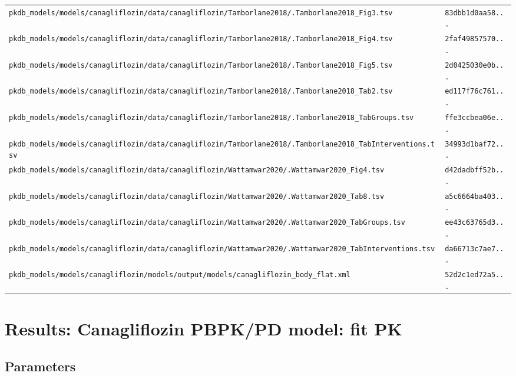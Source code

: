 \documentclass{article}
\begin{document}
\begin{longtable}{ll}
\texttt{pkdb\_models/models/canagliflozin/data/canagliflozin/Tamborlane2018/.Tamborlane2018\_Fig3.tsv} & \texttt{83dbb1d0aa58...} \\
\texttt{pkdb\_models/models/canagliflozin/data/canagliflozin/Tamborlane2018/.Tamborlane2018\_Fig4.tsv} & \texttt{2faf49857570...} \\
\texttt{pkdb\_models/models/canagliflozin/data/canagliflozin/Tamborlane2018/.Tamborlane2018\_Fig5.tsv} & \texttt{2d0425030e0b...} \\
\texttt{pkdb\_models/models/canagliflozin/data/canagliflozin/Tamborlane2018/.Tamborlane2018\_Tab2.tsv} & \texttt{ed117f76c761...} \\
\texttt{pkdb\_models/models/canagliflozin/data/canagliflozin/Tamborlane2018/.Tamborlane2018\_TabGroups.tsv} & \texttt{ffe3ccbea06e...} \\
\texttt{pkdb\_models/models/canagliflozin/data/canagliflozin/Tamborlane2018/.Tamborlane2018\_TabInterventions.tsv} & \texttt{34993d1baf72...} \\
\texttt{pkdb\_models/models/canagliflozin/data/canagliflozin/Wattamwar2020/.Wattamwar2020\_Fig4.tsv} & \texttt{d42dadbff52b...} \\
\texttt{pkdb\_models/models/canagliflozin/data/canagliflozin/Wattamwar2020/.Wattamwar2020\_Tab8.tsv} & \texttt{a5c6664ba403...} \\
\texttt{pkdb\_models/models/canagliflozin/data/canagliflozin/Wattamwar2020/.Wattamwar2020\_TabGroups.tsv} & \texttt{ee43c63765d3...} \\
\texttt{pkdb\_models/models/canagliflozin/data/canagliflozin/Wattamwar2020/.Wattamwar2020\_TabInterventions.tsv} & \texttt{da66713c7ae7...} \\
\texttt{pkdb\_models/models/canagliflozin/models/output/models/canagliflozin\_body\_flat.xml} & \texttt{52d2c1ed72a5...} \\
\end{longtable}

\section{Results: Canagliflozin PBPK/PD model: fit PK}

\subsection{Parameters}
\end{document}
